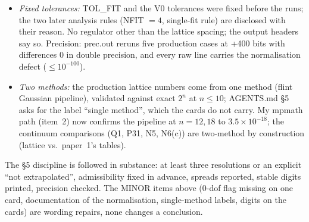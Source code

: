 \documentclass[11pt]{article}
\begin{document}
\begin{itemize}
 more digits plus the fit spread (e.g.\ $4.3918\times10^{-3}\pm4.5\times10^{-6}$, title ``0.0186''), which is the
 project's practice for extrapolations (cf.\ corner-kernel-two-frames) but is more than \S5's ``only digits stable
 across the two finest resolutions'' allows if read literally. MINOR; the orchestrator should decide the reading.
\item \emph{Fixed tolerances:} TOL\_FIT and the V0 tolerances were fixed before the runs; the two later analysis
 rules (NFIT $=4$, single-fit rule) are disclosed with their reason. No regulator other than the lattice spacing;
 the output headers say so. Precision: prec.out reruns five production cases at +400 bits with differences $0$ in
 double precision, and every raw line carries the normalisation defect ($\le10^{-100}$).
\item \emph{Two methods:} the production lattice numbers come from one method (flint Gaussian pipeline), validated
 against exact $2^n$ at $n\le10$; AGENTS.md \S5 asks for the label ``single method'', which the cards do not carry.
 My mpmath path (item~2) now confirms the pipeline at $n=12,18$ to $3.5\times10^{-18}$; the continuum comparisons
 (Q1, P31, N5, N6(c)) are two-method by construction (lattice vs.\ paper~1's tables).
\end{itemize}
\begin{verdictok}
The \S5 discipline is followed in substance: at least three resolutions or an explicit ``not extrapolated'',
admissibility fixed in advance, spreads reported, stable digits printed, precision checked. The MINOR items above
(0-dof flag missing on one card, documentation of the normalisation, single-method labels, digits on the cards)
are wording repairs, none changes a conclusion.
\end{verdictok}
\end{document}
